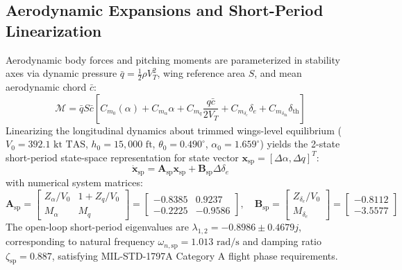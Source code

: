 \documentclass[review,12pt]{elsarticle}
\begin{document}
\subsection{Aerodynamic Expansions and Short-Period Linearization}
Aerodynamic body forces and pitching moments are parameterized in stability axes via dynamic pressure $\bar{q} = \frac{1}{2}\rho V_T^2$, wing reference area $S$, and mean aerodynamic chord $\bar{c}$:
\begin{equation}
    \mathcal{M} = \bar{q} S \bar{c} \left[ C_{m_0}(\alpha) + C_{m_\alpha} \alpha + C_{m_q} \frac{q\bar{c}}{2V_T} + C_{m_{\delta_e}} \delta_e + C_{m_{\delta_{\text{th}}}} \delta_{\text{th}} \right]
\end{equation}
Linearizing the longitudinal dynamics about trimmed wings-level equilibrium ($V_0 = 392.1\text{ kt TAS}$, $h_0 = 15{,}000\text{ ft}$, $\theta_0 = 0.490^\circ$, $\alpha_0 = 1.659^\circ$) yields the 2-state short-period state-space representation for state vector $\bm{x}_{\text{sp}} = [\Delta\alpha, \Delta q]^T$:
\begin{equation}
    \dot{\bm{x}}_{\text{sp}} = \bm{A}_{\text{sp}} \bm{x}_{\text{sp}} + \bm{B}_{\text{sp}} \Delta\delta_e
\end{equation}
with numerical system matrices:
\begin{equation}
    \bm{A}_{\text{sp}} = \begin{bmatrix} Z_\alpha / V_0 & 1 + Z_q / V_0 \\ M_\alpha & M_q \end{bmatrix} = \begin{bmatrix} -0.8385 & 0.9237 \\ -0.2225 & -0.9586 \end{bmatrix}, \quad 
    \bm{B}_{\text{sp}} = \begin{bmatrix} Z_{\delta_e} / V_0 \\ M_{\delta_e} \end{bmatrix} = \begin{bmatrix} -0.8112 \\ -3.5577 \end{bmatrix}
\end{equation}
The open-loop short-period eigenvalues are $\lambda_{1,2} = -0.8986 \pm 0.4679j$, corresponding to natural frequency $\omega_{n,\text{sp}} = 1.013\text{ rad/s}$ and damping ratio $\zeta_{\text{sp}} = 0.887$, satisfying MIL-STD-1797A Category A flight phase requirements.
\end{document}
